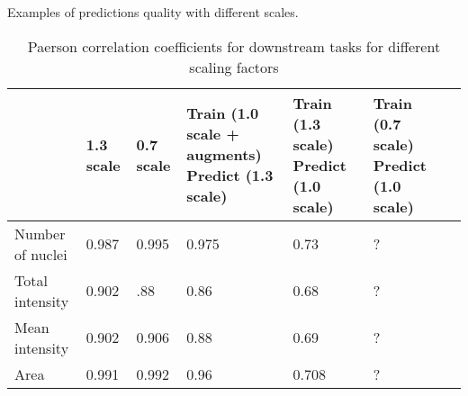 Examples of predictions quality with different scales.

\begin{table}[H]
    \centering
    \caption{Paerson correlation coefficients for downstream tasks for different scaling factors} 
        \begin{adjustbox}{width=\textwidth}
            \begin{tabular}{|M{35mm}|M{35mm}|M{35mm}|M{35mm}|M{35mm}|M{35mm}|M{35mm}|}\hline
                &1.3 scale&0.7 scale&Train (1.0 scale + augments) \newline Predict (1.3 scale)&Train (1.3 scale) \newline Predict (1.0 scale)&Train (0.7 scale) \newline Predict (1.0 scale)
                \\\hline\hline
                Number of nuclei&0.987&0.995&0.975&0.73&?\\\hline
                Total intensity&0.902&.88&0.86&0.68&?\\\hline
                Mean intensity&0.902&0.906&0.88&0.69&?\\\hline
                Area&0.991&0.992&0.96&0.708&?\\\hline
            \end{tabular}
        \end{adjustbox}
\end{table}
